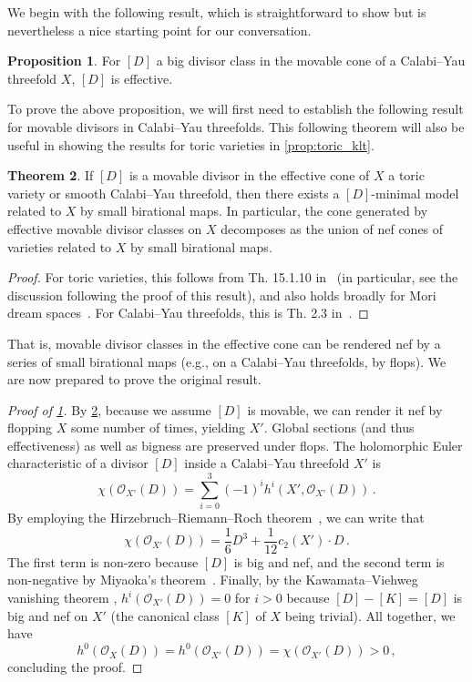 \documentclass[11pt,dvipsnames]{article}
\theoremstyle{definition}
\newtheorem{theorem}{Theorem}
\newtheorem{prop}[theorem]{Proposition}
\begin{document}
We begin with the following result, which is straightforward to show but is nevertheless a nice starting point for our conversation.
\begin{prop}
    For $[D]$ a big divisor class in the movable cone of a Calabi--Yau threefold $X$, $[D]$ is effective. \label{th:big_movable_CY}
\end{prop}
To prove the above proposition, we will first need to establish the following result for movable divisors in Calabi--Yau threefolds. This following theorem will also be useful in showing the results for toric varieties in \cref{prop:toric_klt}.
\begin{theorem}
    If $[D]$ is a movable divisor in the effective cone of $X$ a toric variety or smooth Calabi--Yau threefold, then there exists a $[D]$-minimal model related to $X$ by small birational maps. In particular, the cone generated by effective movable divisor classes on $X$ decomposes as the union of nef cones of varieties related to $X$ by small birational maps.
    \label{th:movable_is_nef_somewhere}
\end{theorem}
\begin{proof}
    For toric varieties, this follows from Th. 15.1.10 in~\cite{cls} (in particular, see the discussion following the proof of this result), and also holds broadly for Mori dream spaces~\cite{hu2000mori}. For Calabi--Yau threefolds, this is Th. 2.3 in~\cite{kawamataCone}.
\end{proof}
That is, movable divisor classes in the effective cone can be rendered nef by a series of small birational maps (e.g., on a Calabi--Yau threefolds, by flops). We are now prepared to prove the original result.
\begin{proof}[Proof of \cref{th:big_movable_CY}]
    By \cref{th:movable_is_nef_somewhere}, because we assume $[D]$ is movable, we can render it nef by flopping $X$ some number of times, yielding $X'$. Global sections (and thus effectiveness) as well as bigness are preserved under flops. The holomorphic Euler characteristic of a divisor $[D]$ inside a Calabi--Yau threefold $X'$ is 
    \begin{equation}
        \chi(\mathcal{O}_{X'}(D)) = \sum_{i=0}^3 (-1)^i h^i(X', \mathcal{O}_{X'}(D)) \, .
    \end{equation}
    By employing the Hirzebruch--Riemann--Roch theorem~\cite{Hirzebruch1966}, we can write that 
    \begin{equation}
        \chi(\mathcal{O}_{X'}(D)) = \frac{1}{6}D^3 + \frac{1}{12}c_2(X') \cdot D \, .
    \end{equation}
    The first term is non-zero because $[D]$ is big and nef, and the second term is non-negative by Miyaoka's theorem~\cite{miyaoka1987chern}. Finally, by the Kawamata--Viehweg vanishing theorem \cite{kawamata1982generalization, viehweg1982vanishing}, $h^i(\mathcal{O}_{X'}(D)) = 0$ for $i > 0$ because $[D] - [K] = [D]$ is big and nef on $X'$ (the canonical class $[K]$ of $X$ being trivial). All together, we have
    \begin{equation}
        h^0(\mathcal{O}_X(D)) = h^0(\mathcal{O}_{X'}(D)) = \chi(\mathcal{O}_{X'}(D)) > 0 \, ,
    \end{equation}
    concluding the proof.
\end{proof}
\end{document}
